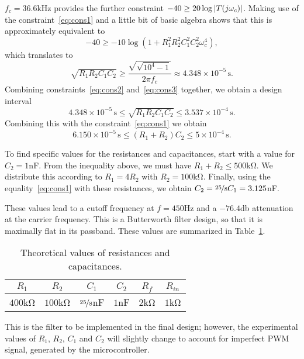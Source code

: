 $f_c = 36.6$\unit{\kilo\hertz} provides the further constraint $-40 \geq 20 \log{
\left|{T(j\omega_c)}\right|}$. Making use of the constraint~\eqref{eq:cons1} and a little
bit of basic algebra shows that this is approximately equivalent to \[ -40 \geq
-10 \log{\left(1+R_1^2R_2^2C_1^2C_2^2\omega_c^4\right)}, \] which translates to  
%
\begin{equation}
    \sqrt{R_1R_2C_1C_2} \geq \frac{\sqrt{\sqrt{10^4-1}}}{2\pi f_c} \approx 4.348
    \times 10^{-5}\,\unit{\second}.
    \label{eq:cons3}
\end{equation}
%
Combining constraints~\eqref{eq:cons2} and~\eqref{eq:cons3} together, we obtain
a design interval \[ 4.348 \times 10^{-5}\,\unit{\second} \leq
\sqrt{R_1R_2C_1C_2} \leq 3.537 \times 10^{-4}\, \unit{\second}. \] Combining
this with the constraint~\eqref{eq:cons1} we obtain \[ 6.150 \times
10^{-5}\,\unit{\second} \leq (R_1+R_2)C_2 \leq 5 \times 10^{-4}\,\unit{\second}.
\]

To find specific values for the resistances and capacitances, start with a value
for $C_2 = 1$\unit{\nano\farad}. From the inequality above, we must have $R_1 +
R_2 \leq 500$\unit{\kilo\ohm}. We distribute this according to $R_1 = 4R_2$ with
$R_2 = 100$\unit{\kilo\ohm}. Finally, using the equality~\eqref{eq:cons1} with
these resistances, we obtain $C_2 = \nicefrac{25}{8}C_1 =
3.125$\unit{\nano\farad}.

These values lead to a cutoff frequency at $f = 450$\unit{\hertz} and a
$-76.4$\unit{\decibel} attenuation at the carrier frequency. This is a
Butterworth filter design, so that it is maximally flat in its passband. These
values are summarized in Table~\ref{tab:theoretical_values}.

{\renewcommand{\arraystretch}{1.5}
\begin{table}[t]
    \centering
    \caption{Theoretical values of resistances and capacitances.}
    \begin{tabular}{*6c}
        \toprule
        $R_1$ & $R_2$ & $C_1$ & $C_2$ & $R_f$ & $R_{in}$ \\    
        \hline
        \midrule
        $400$\unit{\kilo\ohm} & $100$\unit{\kilo\ohm} &
        $\nicefrac{25}{8}$\unit{\nano\farad} & $1$\unit{\nano\farad} &
        $2$\unit{\kilo\ohm} & $1$\unit{\kilo\ohm} \\
        \bottomrule
    \end{tabular}
    \label{tab:theoretical_values}
    \vspace{-1em}
\end{table}
}

\begin{rem}
    This is the filter to be implemented in the final design; however, the
    experimental values of $R_{1}$, $R_2$, $C_{1}$ and $C_2$ will
    slightly change to account for imperfect PWM signal, generated by the
    microcontroller.
\end{rem}

